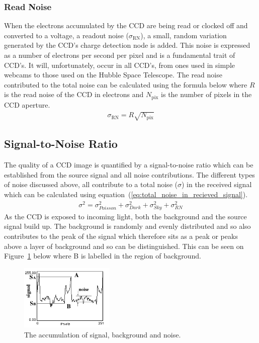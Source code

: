 		\subsubsection{Read Noise} %
		\label{ssub:read_noise}
			When the electrons accumulated by the CCD are being read or clocked off and converted to a voltage, a readout noise ($\sigma_\text{RN}$), a small, random variation generated by the CCD's charge detection node is added. This noise is expressed as a number of electrons per second per pixel and is a fundamental trait of CCD's. It will, unfortunately, occur in all CCD's, from ones used in simple webcams to those used on the Hubble Space Telescope\cite{Understanding_CCD_Read_Noise}. The read noise contributed to the total noise can be calculated using the formula below where $R$ is the read noise of the CCD in electrons and $N_\text{pix}$ is the number of pixels in the CCD aperture.
			\begin{align}
				\sigma_\text{RN} = R\sqrt{N_\text{pix}}
			\end{align}

	\subsection{Signal-to-Noise Ratio} %
	\label{ssub:signal_to_noise_ratio}
		The quality of a CCD image is quantified by a signal-to-noise ratio which can be established from the source signal and all noise contributions. The different types of noise discussed above, all contribute to a total noise ($\sigma$) in the received signal which can be calculated using equation~(\ref{eq:total_noise_in_recieved_signal}).
		\begin{align}
			\sigma^{2} = \sigma_{Poisson}^{2} + \sigma_{Dark}^{2} + \sigma_{Sky}^{2} + \sigma_{RN}^{2} \label{eq:total_noise_in_recieved_signal}
		\end{align}
		As the CCD is exposed to incoming light, both the background and the source signal build up. The background is randomly and evenly distributed and so also contributes to the peak of the signal which therefore sits as a peak or peaks above a layer of background and so can be distinguished. This can be seen on Figure~\ref{fig:signal_noise_accumulation} below where B is labelled in the region of background\cite{Signal_to_Noise_Ratio}.
		\begin{figure}[htbp]
			\centering
			\includegraphics[width=0.4\textwidth]{../Images/SNR.png}
			\caption{The accumulation of signal, background and noise.\label{fig:signal_noise_accumulation}}
		\end{figure}

